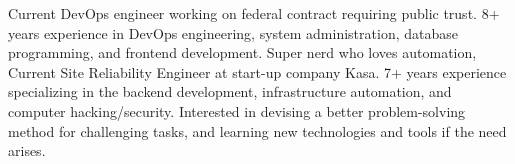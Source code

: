 

\begin{cvparagraph}

Current DevOps engineer working on federal contract requiring public trust.  8+ years experience in DevOps engineering, system administration, database programming, and frontend development.  Super nerd who loves automation,
Current Site Reliability Engineer at start-up company Kasa. 7+ years experience specializing in the backend development, infrastructure automation, and computer hacking/security. Interested in devising a better problem-solving method for challenging tasks, and learning new technologies and tools if the need arises.
\end{cvparagraph}
